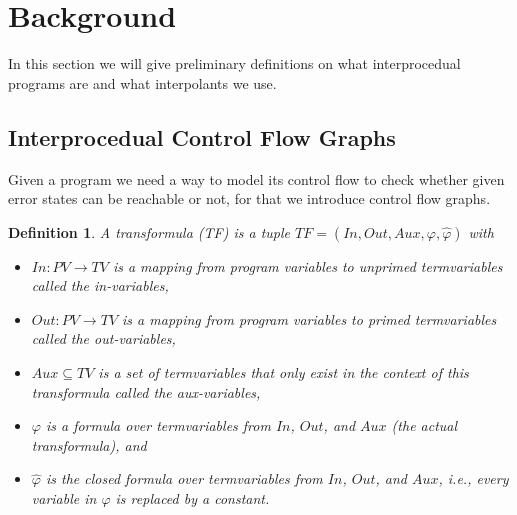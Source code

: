 \documentclass{article}
\newtheorem{mydef}{Definition}
\newcommand\mycom[1]{}
\newcommand\mycom[1]{#1}
\newcommand{\dd}[1]{\mycom{\todo[color=orange!40,inline]{\small DD: #1}}}
\begin{document}
	\section{Background}
	In this section we will give preliminary definitions on what interprocedual programs are and what interpolants we use.
	
    
    \newcommand{\tf}{\ensuremath{\varphi}\xspace}
    \newcommand{\ctf}{\ensuremath{\hat{\varphi}}\xspace}
    \newcommand{\invars}{\ensuremath{In}\xspace}
    \newcommand{\outvars}{\ensuremath{Out}\xspace}
    \newcommand{\auxvars}{\ensuremath{Aux}\xspace}
	
	\subsection{Interprocedual Control Flow Graphs}	
	Given a program we need a way to model its control flow to check whether given error states can be reachable or not, for that we introduce control flow graphs.
    \dd{complete transformula def}
    \begin{mydef}
        A transformula (TF) is a tuple $TF = (\invars, \outvars, \auxvars, \tf, \ctf)$ with 
        \begin{itemize}
          \item $\invars : PV \rightarrow TV$ is a mapping from program variables to unprimed termvariables called the in-variables, 
          \item $\outvars : PV \rightarrow TV$ is a mapping from program variables to primed termvariables called the out-variables, 
          \item $\auxvars \subseteq TV$ is a set of termvariables that only exist in the context of this transformula called the aux-variables, 
          \item $\tf$ is a formula over termvariables from $\invars$, $\outvars$, and $\auxvars$ (the actual transformula), and
          \item $\ctf$ is the closed formula over termvariables from $\invars$, $\outvars$, and $\auxvars$, i.e., every variable in \tf is replaced by a constant. 
        \end{itemize}
        \dd{Explain that in \ctf each invar is replaced by \emph{the} constant of the corresponding program variable, ...}
    \end{mydef}
\end{document}
